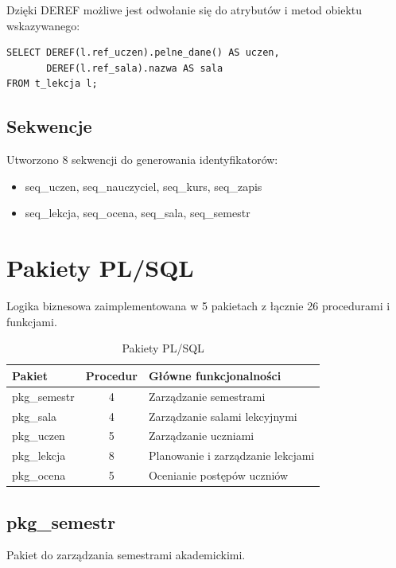\documentclass[12pt,a4paper]{article}
\begin{document}
Dzięki DEREF możliwe jest odwołanie się do atrybutów i metod obiektu wskazywanego:
\begin{verbatim}
SELECT DEREF(l.ref_uczen).pelne_dane() AS uczen,
       DEREF(l.ref_sala).nazwa AS sala
FROM t_lekcja l;
\end{verbatim}

\subsection{Sekwencje}
Utworzono 8 sekwencji do generowania identyfikatorów:
\begin{itemize}[nosep]
    \item seq\_uczen, seq\_nauczyciel, seq\_kurs, seq\_zapis
    \item seq\_lekcja, seq\_ocena, seq\_sala, seq\_semestr
\end{itemize}

\section{Pakiety PL/SQL}

Logika biznesowa zaimplementowana w 5 pakietach z łącznie 26 procedurami i funkcjami.

\begin{table}[h]
\centering
\begin{tabular}{|l|c|p{6cm}|}
\hline
\textbf{Pakiet} & \textbf{Procedur} & \textbf{Główne funkcjonalności} \\
\hline
pkg\_semestr & 4 & Zarządzanie semestrami \\
pkg\_sala & 4 & Zarządzanie salami lekcyjnymi \\
pkg\_uczen & 5 & Zarządzanie uczniami \\
pkg\_lekcja & 8 & Planowanie i zarządzanie lekcjami \\
pkg\_ocena & 5 & Ocenianie postępów uczniów \\
\hline
\end{tabular}
\caption{Pakiety PL/SQL}
\end{table}

\subsection{pkg\_semestr}
Pakiet do zarządzania semestrami akademickimi.
\end{document}
